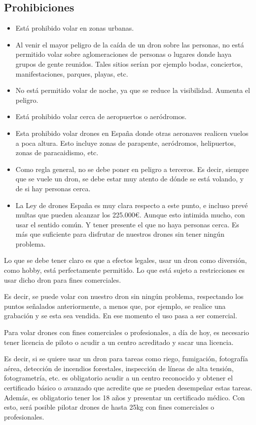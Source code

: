 \subsection{Prohibiciones}

\begin{itemize}
\item Está prohibido volar en zonas urbanas.
\item Al venir el mayor peligro de la caída de un dron sobre las personas, no está permitido volar sobre aglomeraciones de personas o lugares donde haya grupos de gente reunidos. Tales sitios serían por ejemplo bodas, conciertos, manifestaciones, parques, playas, etc.
\item No está permitido volar de noche, ya que se reduce la visibilidad. Aumenta el peligro. 
\item Está prohibido volar cerca de aeropuertos o aeródromos.
\item Esta prohibido volar drones en España donde otras aeronaves realicen vuelos a poca altura. Esto incluye zonas de parapente, aeródromos, helipuertos, zonas de paracaidismo, etc.
\item Como regla general, no se debe poner en peligro a terceros. Es decir, siempre que se vuele un dron, se debe estar muy atento de dónde se está volando, y de si hay personas cerca.
\item La Ley de drones España es muy clara respecto a este punto, e incluso prevé multas que pueden alcanzar los 225.000€. Aunque esto intimida mucho, con usar el sentido común. Y tener presente el que no haya personas cerca. Es más que suficiente para disfrutar de nuestros drones sin tener ningún problema.
\end{itemize}

Lo que se debe tener claro es que a efectos legales, usar un dron como diversión, como hobby, está perfectamente permitido. Lo que está sujeto a restricciones  es usar dicho dron para fines comerciales.

Es decir, se puede volar con nuestro dron sin ningún problema, respectando los puntos señalados anteriormente, a menos que, por ejemplo,  se realice una grabación y se esta sea vendida. En ese momento el uso pasa a ser comercial.

Para volar drones con fines comerciales o profesionales, a día de hoy, es necesario tener licencia de piloto o acudir a un centro acreditado y sacar una licencia.

Es decir, si se quiere usar un dron para tareas como riego, fumigación, fotografía aérea, detección de incendios forestales, inspección de líneas de alta tensión,  fotogrametría, etc. es obligatorio acudir a un centro reconocido y obtener el certificado básico o avanzado que acredite que se pueden desempeñar estas tareas. Además, es obligatorio tener los 18 años y presentar un certificado médico. Con esto, será posible pilotar drones de hasta 25kg con fines comerciales o profesionales.

